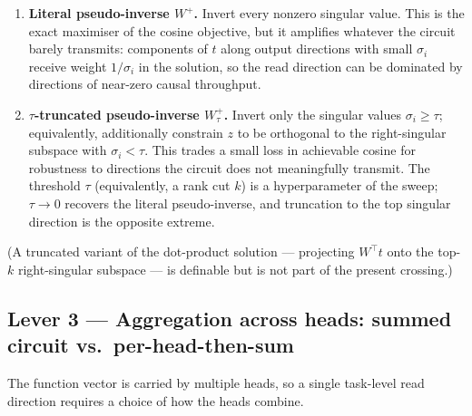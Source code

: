 \documentclass[
]{article}
\begin{document}
\begin{enumerate}
\item
  \textbf{Literal pseudo-inverse $W^{+}$.} Invert every nonzero singular value. This is
  the exact maximiser of the cosine objective, but it amplifies whatever the circuit
  barely transmits: components of $t$ along output directions with small $\sigma_i$
  receive weight $1/\sigma_i$ in the solution, so the read direction can be dominated
  by directions of near-zero causal throughput.
\item
  \textbf{$\tau$-truncated pseudo-inverse $W^{+}_{\tau}$.} Invert only the singular
  values $\sigma_i \ge \tau$; equivalently, additionally constrain $z$ to be orthogonal
  to the right-singular subspace with $\sigma_i < \tau$. This trades a small loss in
  achievable cosine for robustness to directions the circuit does not meaningfully
  transmit. The threshold $\tau$ (equivalently, a rank cut $k$) is a hyperparameter of
  the sweep; $\tau \to 0$ recovers the literal pseudo-inverse, and truncation to the
  top singular direction is the opposite extreme.
\end{enumerate}

(A truncated variant of the dot-product solution --- projecting $W^{\top} t$ onto the
top-$k$ right-singular subspace --- is definable but is not part of the present
crossing.)

\subsection{Lever 3 — Aggregation across heads: summed circuit vs.\
per-head-then-sum}\label{lever-3-aggregation}

The function vector is carried by multiple heads, so a single task-level read direction
requires a choice of how the heads combine.
\end{document}
